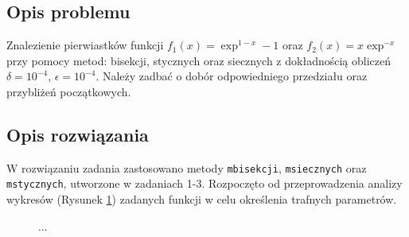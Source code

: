 \documentclass{classrep}
\begin{document}
	\subsection{Opis problemu}
		Znalezienie pierwiastków funkcji $f_1(x)=\exp^{1-x}-1$ oraz $f_2(x)=x\exp^{-x}$ przy pomocy metod: bisekcji, stycznych oraz siecznych z dokładnością obliczeń $\delta=10^{-4}$, $\epsilon=10^{-4}$. Należy zadbać o dobór odpowiedniego przedziału oraz przybliżeń początkowych.
		
	\subsection{Opis rozwiązania}
		W rozwiązaniu zadania zastosowano metody \texttt{mbisekcji}, \texttt{msiecznych} oraz \texttt{mstycznych}, utworzone w zadaniach 1-3.
		Rozpoczęto od przeprowadzenia analizy wykresów (Rysunek \ref{fig:2}) zadanych funkcji w celu określenia trafnych parametrów.
		
		\begin{figure}[!htbp]
			\centering
			 \hfill
  			\caption{...}
  			\label{fig:2}
		\end{figure}		
		
\end{document}
